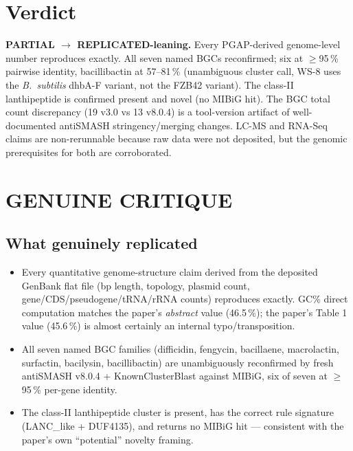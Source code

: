 \documentclass[11pt]{article}
\begin{document}
\section{Verdict}
\textbf{PARTIAL $\rightarrow$ REPLICATED-leaning.} Every PGAP-derived genome-level number reproduces exactly. All seven named BGCs reconfirmed; six at $\geq$95\,\% pairwise identity, bacillibactin at 57--81\,\% (unambiguous cluster call, WS-8 uses the \textit{B.\ subtilis} dhbA-F variant, not the FZB42 variant). The class-II lanthipeptide is confirmed present and novel (no MIBiG hit). The BGC total count discrepancy (19 v3.0 vs 13 v8.0.4) is a tool-version artifact of well-documented antiSMASH stringency/merging changes. LC-MS and RNA-Seq claims are non-rerunnable because raw data were not deposited, but the genomic prerequisites for both are corroborated.

\section{GENUINE CRITIQUE}

\subsection{What genuinely replicated}
\begin{itemize}
\item Every quantitative genome-structure claim derived from the deposited GenBank flat file (bp length, topology, plasmid count, gene/CDS/pseudogene/tRNA/rRNA counts) reproduces exactly. GC\% direct computation matches the paper's \emph{abstract} value (46.5\,\%); the paper's Table 1 value (45.6\,\%) is almost certainly an internal typo/transposition.
\item All seven named BGC families (difficidin, fengycin, bacillaene, macrolactin, surfactin, bacilysin, bacillibactin) are unambiguously reconfirmed by fresh antiSMASH v8.0.4 + KnownClusterBlast against MIBiG, six of seven at $\geq$95\,\% per-gene identity.
\item The class-II lanthipeptide cluster is present, has the correct rule signature (LANC\_like + DUF4135), and returns no MIBiG hit --- consistent with the paper's own ``potential'' novelty framing.
\end{itemize}
\end{document}
